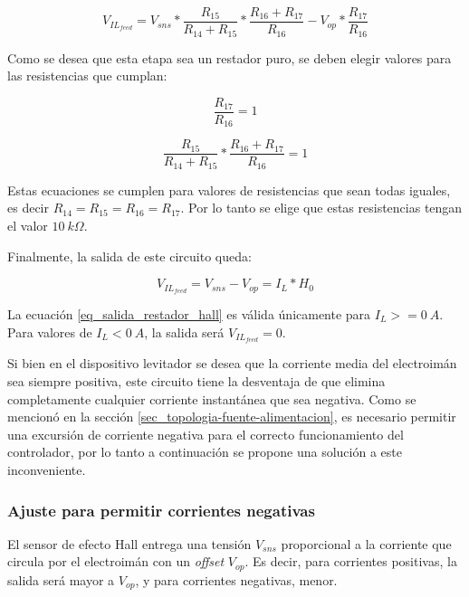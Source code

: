 \begin{equation}
	V_{IL_{feed}}=V_{sns}*\frac{R_{15}}{R_{14}+R_{15}}*\frac{R_{16}+R_{17}}{R_{16}}-V_{op}*\frac{R_{17}}{R_{16}}
\end{equation}

Como se desea que esta etapa sea un restador puro, se deben elegir valores para las resistencias que cumplan:

\begin{equation}
	\frac{R_{17}}{R_{16}}=1
\end{equation}

\begin{equation}
	\frac{R_{15}}{R_{14}+R_{15}}*\frac{R_{16}+R_{17}}{R_{16}}=1
\end{equation}

Estas ecuaciones se cumplen para valores de resistencias que sean todas iguales, es decir $R_{14}=R_{15}=R_{16}=R_{17}$. Por lo tanto se elige que estas resistencias tengan el valor $10\:k\Omega$.

Finalmente, la salida de este circuito queda:

\begin{equation} \label{eq_salida_restador_hall}
	V_{IL_{feed}}=V_{sns}-V_{op}=I_L*H_0
\end{equation}

La ecuación \ref{eq_salida_restador_hall} es válida únicamente para $I_L>=0\:A$. Para valores de $I_L<0\:A$, la salida será $V_{IL_{feed}}=0$.

Si bien en el dispositivo levitador se desea que la corriente media del electroimán sea siempre positiva, este circuito tiene la desventaja de que elimina completamente cualquier corriente instantánea que sea negativa. Como se mencionó en la sección \ref{sec_topologia-fuente-alimentacion}, es necesario permitir una excursión de corriente negativa para el correcto funcionamiento del controlador, por lo tanto a continuación se propone una solución a este inconveniente.

\subsubsection{Ajuste para permitir corrientes negativas}

El sensor de efecto Hall entrega una tensión $V_{sns}$ proporcional a la corriente que circula por el electroimán con un \textsl{offset} $V_{op}$. Es decir, para corrientes positivas, la salida será mayor a $V_{op}$, y para corrientes negativas, menor.

